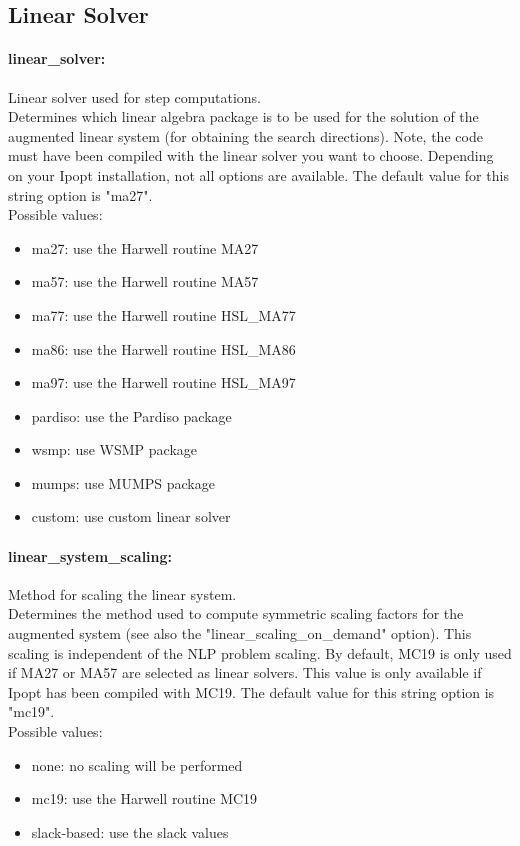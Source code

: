 \subsection{Linear Solver}

\paragraph{linear\_solver:}\label{opt:linear_solver} Linear solver used for step computations. \\
 Determines which linear algebra package is to be used for the solution of the augmented linear system (for obtaining the search directions). Note, the code must have been compiled with the linear solver you want to choose. Depending on your Ipopt installation, not all options are available. The default value for this string option is "ma27".
\\ 
Possible values:
\begin{itemize}
   \item ma27: use the Harwell routine MA27
   \item ma57: use the Harwell routine MA57
   \item ma77: use the Harwell routine HSL\_MA77
   \item ma86: use the Harwell routine HSL\_MA86
   \item ma97: use the Harwell routine HSL\_MA97
   \item pardiso: use the Pardiso package
   \item wsmp: use WSMP package
   \item mumps: use MUMPS package
   \item custom: use custom linear solver
\end{itemize}

\paragraph{linear\_system\_scaling:}\label{opt:linear_system_scaling} Method for scaling the linear system. \\
 Determines the method used to compute symmetric scaling factors for the augmented system (see also the "linear\_scaling\_on\_demand" option).  This scaling is independent of the NLP problem scaling.  By default, MC19 is only used if MA27 or MA57 are selected as linear solvers. This value is only available if Ipopt has been compiled with MC19. The default value for this string option is "mc19".
\\ 
Possible values:
\begin{itemize}
   \item none: no scaling will be performed
   \item mc19: use the Harwell routine MC19
   \item slack-based: use the slack values
\end{itemize}

